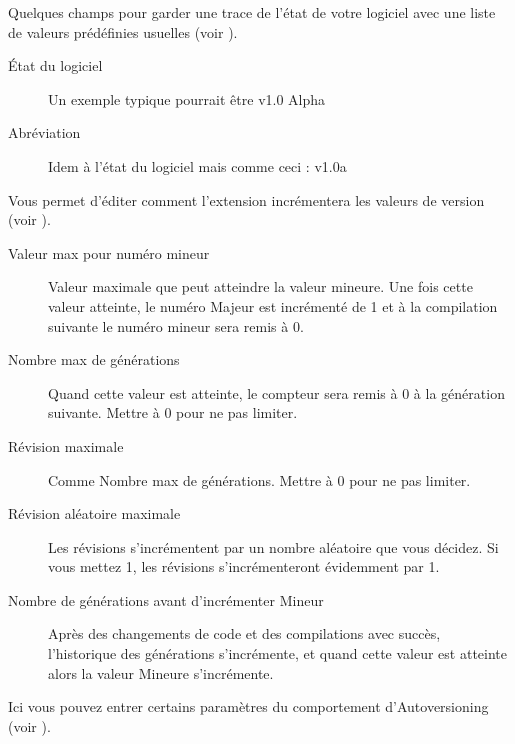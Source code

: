 

Quelques champs pour garder une trace de l'état de votre logiciel avec une liste de valeurs prédéfinies usuelles (voir ).

\begin{description}
\item[État du logiciel] Un exemple typique pourrait être v1.0 Alpha
\item[Abréviation] Idem à l'état du logiciel mais comme ceci : v1.0a
\end{description}



Vous permet d'éditer comment l'extension incrémentera les valeurs de version (voir ).


\begin{description}
\item[Valeur max pour numéro mineur] Valeur maximale que peut atteindre la valeur mineure. Une fois cette valeur atteinte, le numéro Majeur est incrémenté de 1 et à la compilation suivante le numéro mineur sera remis à 0.
\item[Nombre max de générations] Quand cette valeur est atteinte, le compteur sera remis à 0 à la génération suivante. Mettre à 0 pour ne pas limiter.
\item[Révision maximale] Comme Nombre max de générations. Mettre à 0 pour ne pas limiter.
\item[Révision aléatoire maximale] Les révisions s'incrémentent par un nombre aléatoire que vous décidez. Si vous mettez 1, les révisions s'incrémenteront évidemment par 1.
\item[Nombre de générations avant d'incrémenter Mineur] Après des changements de code et des compilations avec succès, l'historique des générations s'incrémente, et quand cette valeur est atteinte alors la valeur Mineure s'incrémente.
\end{description}


Ici vous pouvez entrer certains paramètres du comportement d'Autoversioning (voir ).

